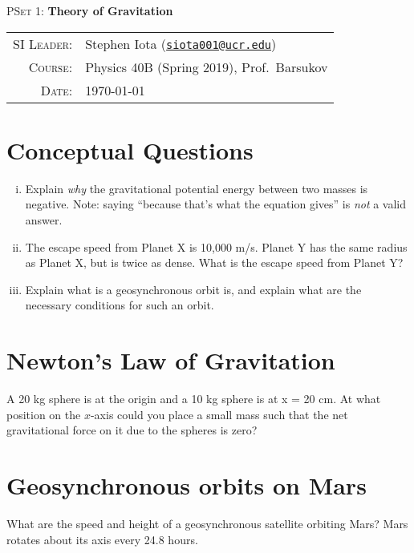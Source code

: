 \documentclass[11pt]{article}
\newcommand{\email}[1]{\texttt{\href{mailto:#1}{#1}}}
\begin{document}
\begin{center}

\Large{\textsc{PSet 1}: \textbf{Theory of Gravitation}}
\end{center}
\vspace{.5mm}



\begin{tabular}{rl}
\textsc{SI Leader}:
&
Stephen Iota (\email{siota001@ucr.edu})
\\
\textsc{Course}:
&
Physics 40B (Spring 2019), Prof.~Barsukov
\\
\textsc{Date}:
&
\today
\end{tabular}



\section{Conceptual Questions}

\begin{enumerate}[(i)]
	\item Explain \textit{why} the gravitational potential energy between two masses is negative. Note: saying ``because that's what the equation gives'' is \textit{not} a valid answer.
	\item The escape speed from Planet X is 10,000 m/s. Planet Y has the same radius as Planet X, but is twice as dense. What is the escape speed from Planet Y?
	\item Explain what is a geosynchronous orbit is, and explain what are the necessary conditions for such an orbit.
\end{enumerate}

\section{Newton's Law of Gravitation}

A 20 kg sphere is at the origin and a 10 kg sphere is at x = 20 cm. At what position on the $x$-axis could you place a small mass such that the net gravitational force on it due to the spheres is zero?



 \section{Geosynchronous orbits on Mars}
 What are the speed and height of a geosynchronous satellite orbiting Mars? Mars rotates about its axis every 24.8 hours.
\end{document}
